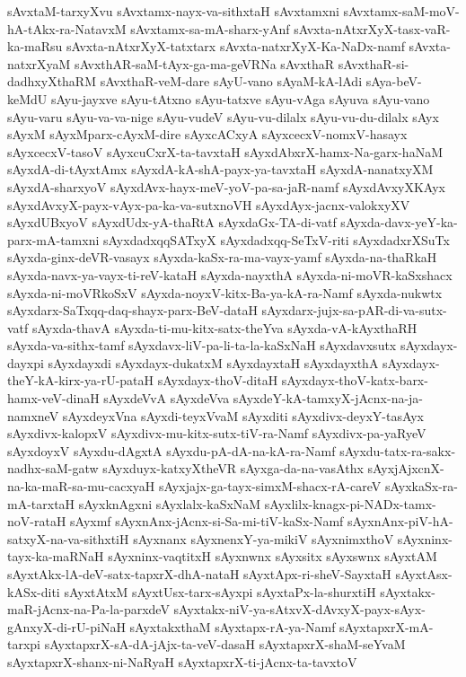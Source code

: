 {sAvxtaM-tarxyXvu
sAvxtamx-nayx-va-sithxtaH
sAvxtamxni
sAvxtamx-saM-moV-hA-tAkx-ra-NatavxM
sAvxtamx-sa-mA-sharx-yAnf
sAvxta-nAtxrXyX-tasx-vaR-ka-maRsu
sAvxta-nAtxrXyX-tatxtarx
sAvxta-natxrXyX-Ka-NaDx-namf
sAvxta-natxrXyaM
sAvxthAR-saM-tAyx-ga-ma-geVRNa
sAvxthaR
sAvxthaR-si-dadhxyXthaRM
sAvxthaR-veM-dare
sAyU-vano
sAyaM-kA-lAdi
sAya-beV-keMdU
sAyu-jayxve
sAyu-tAtxno
sAyu-tatxve
sAyu-vAga
sAyuva
sAyu-vano
sAyu-varu
sAyu-va-va-nige
sAyu-vudeV
sAyu-vu-dilalx
sAyu-vu-du-dilalx
sAyx
sAyxM
sAyxMparx-cAyxM-dire
sAyxcACxyA
sAyxcecxV-nomxV-hasayx
sAyxcecxV-tasoV
sAyxcuCxrX-ta-tavxtaH
sAyxdAbxrX-hamx-Na-garx-haNaM
sAyxdA-di-tAyxtAmx
sAyxdA-kA-shA-payx-ya-tavxtaH
sAyxdA-nanatxyXM
sAyxdA-sharxyoV
sAyxdAvx-hayx-meV-yoV-pa-sa-jaR-namf
sAyxdAvxyXKAyx
sAyxdAvxyX-payx-vAyx-pa-ka-va-sutxnoVH
sAyxdAyx-jacnx-valokxyXV
sAyxdUBxyoV
sAyxdUdx-yA-thaRtA
sAyxdaGx-TA-di-vatf
sAyxda-davx-yeY-ka-parx-mA-tamxni
sAyxdadxqqSATxyX
sAyxdadxqq-SeTxV-riti
sAyxdadxrXSuTx
sAyxda-ginx-deVR-vasayx
sAyxda-kaSx-ra-ma-vayx-yamf
sAyxda-na-thaRkaH
sAyxda-navx-ya-vayx-ti-reV-kataH
sAyxda-nayxthA
sAyxda-ni-moVR-kaSxshacx
sAyxda-ni-moVRkoSxV
sAyxda-noyxV-kitx-Ba-ya-kA-ra-Namf
sAyxda-nukwtx
sAyxdarx-SaTxqq-daq-shayx-parx-BeV-dataH
sAyxdarx-jujx-sa-pAR-di-va-sutx-vatf
sAyxda-thavA
sAyxda-ti-mu-kitx-satx-theYva
sAyxda-vA-kAyxthaRH
sAyxda-va-sithx-tamf
sAyxdavx-liV-pa-li-ta-la-kaSxNaH
sAyxdavxsutx
sAyxdayx-dayxpi
sAyxdayxdi
sAyxdayx-dukatxM
sAyxdayxtaH
sAyxdayxthA
sAyxdayx-theY-kA-kirx-ya-rU-pataH
sAyxdayx-thoV-ditaH
sAyxdayx-thoV-katx-barx-hamx-veV-dinaH
sAyxdeVvA
sAyxdeVva
sAyxdeY-kA-tamxyX-jAcnx-na-ja-namxneV
sAyxdeyxVna
sAyxdi-teyxVvaM
sAyxditi
sAyxdivx-deyxY-tasAyx
sAyxdivx-kalopxV
sAyxdivx-mu-kitx-sutx-tiV-ra-Namf
sAyxdivx-pa-yaRyeV
sAyxdoyxV
sAyxdu-dAgxtA
sAyxdu-pA-dA-na-kA-ra-Namf
sAyxdu-tatx-ra-sakx-nadhx-saM-gatw
sAyxduyx-katxyXtheVR
sAyxga-da-na-vasAthx
sAyxjAjxcnX-na-ka-maR-sa-mu-cacxyaH
sAyxjajx-ga-tayx-simxM-shacx-rA-careV
sAyxkaSx-ra-mA-tarxtaH
sAyxknAgxni
sAyxlalx-kaSxNaM
sAyxlilx-knagx-pi-NADx-tamx-noV-rataH
sAyxmf
sAyxnAnx-jAcnx-si-Sa-mi-tiV-kaSx-Namf
sAyxnAnx-piV-hA-satxyX-na-va-sithxtiH
sAyxnanx
sAyxnenxY-ya-mikiV
sAyxnimxthoV
sAyxninx-tayx-ka-maRNaH
sAyxninx-vaqtitxH
sAyxnwnx
sAyxsitx
sAyxswnx
sAyxtAM
sAyxtAkx-lA-deV-satx-tapxrX-dhA-nataH
sAyxtApx-ri-sheV-SayxtaH
sAyxtAsx-kASx-diti
sAyxtAtxM
sAyxtUsx-tarx-sAyxpi
sAyxtaPx-la-shurxtiH
sAyxtakx-maR-jAcnx-na-Pa-la-parxdeV
sAyxtakx-niV-ya-sAtxvX-dAvxyX-payx-sAyx-gAnxyX-di-rU-piNaH
sAyxtakxthaM
sAyxtapx-rA-ya-Namf
sAyxtapxrX-mA-tarxpi
sAyxtapxrX-sA-dA-jAjx-ta-veV-dasaH
sAyxtapxrX-shaM-seYvaM
sAyxtapxrX-shanx-ni-NaRyaH
sAyxtapxrX-ti-jAcnx-ta-tavxtoV
}
